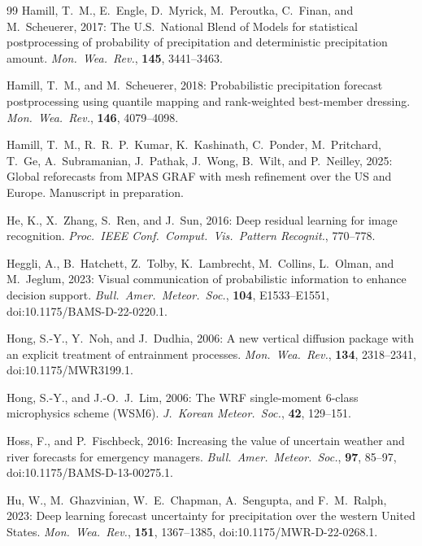 \documentclass[11pt]{article}
\begin{document}
\begin{thebibliography}{99}
Hamill, T.~M., E.\ Engle, D.\ Myrick, M.\ Peroutka, C.\ Finan,
and M.\ Scheuerer, 2017:
The U.S.\ National Blend of Models for statistical postprocessing
of probability of precipitation and deterministic precipitation
amount.
\textit{Mon.\ Wea.\ Rev.}, \textbf{145}, 3441--3463.

Hamill, T.~M., and M.\ Scheuerer, 2018:
Probabilistic precipitation forecast postprocessing using quantile
mapping and rank-weighted best-member dressing.
\textit{Mon.\ Wea.\ Rev.}, \textbf{146}, 4079--4098.

Hamill, T.~M., R.~R.~P.\ Kumar, K.\ Kashinath, C.\ Ponder,
M.\ Pritchard, T.\ Ge, A.\ Subramanian, J.\ Pathak, J.\ Wong,
B.\ Wilt, and P.\ Neilley, 2025:
Global reforecasts from MPAS GRAF with mesh refinement over the
US and Europe.
Manuscript in preparation.

He, K., X.\ Zhang, S.\ Ren, and J.\ Sun, 2016:
Deep residual learning for image recognition.
\textit{Proc.\ IEEE Conf.\ Comput.\ Vis.\ Pattern Recognit.},
770--778.

Heggli, A., B.\ Hatchett, Z.\ Tolby, K.\ Lambrecht, M.\ Collins,
L.\ Olman, and M.\ Jeglum, 2023:
Visual communication of probabilistic information to enhance
decision support.
\textit{Bull.\ Amer.\ Meteor.\ Soc.}, \textbf{104}, E1533--E1551,
doi:10.1175/BAMS-D-22-0220.1.

Hong, S.-Y., Y.\ Noh, and J.\ Dudhia, 2006:
A new vertical diffusion package with an explicit treatment of entrainment processes.
\textit{Mon.\ Wea.\ Rev.}, \textbf{134}, 2318--2341,
doi:10.1175/MWR3199.1.

Hong, S.-Y., and J.-O.\ J.\ Lim, 2006:
The WRF single-moment 6-class microphysics scheme (WSM6).
\textit{J.\ Korean Meteor.\ Soc.}, \textbf{42}, 129--151.

Hoss, F., and P.\ Fischbeck, 2016:
Increasing the value of uncertain weather and river forecasts for
emergency managers.
\textit{Bull.\ Amer.\ Meteor.\ Soc.}, \textbf{97}, 85--97,
doi:10.1175/BAMS-D-13-00275.1.

Hu, W., M.\ Ghazvinian, W.~E.\ Chapman, A.\ Sengupta, and
F.~M.\ Ralph, 2023:
Deep learning forecast uncertainty for precipitation over the
western United States.
\textit{Mon.\ Wea.\ Rev.}, \textbf{151}, 1367--1385,
doi:10.1175/MWR-D-22-0268.1.


\end{thebibliography}
\end{document}
